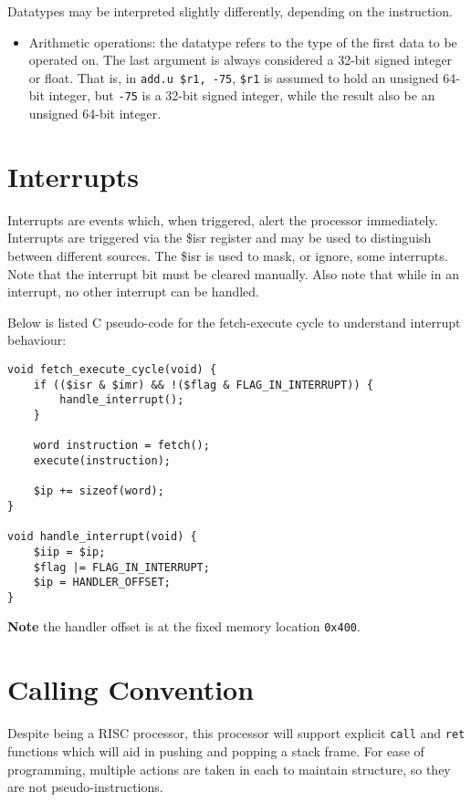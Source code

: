 \documentclass[10pt]{article}
\begin{document}
\bigskip
Datatypes may be interpreted slightly differently, depending on the instruction.

\begin{itemize}
    \item Arithmetic operations: the datatype refers to the type of the first data to be operated on.
    The last argument is always considered a 32-bit signed integer or float.
    That is, in \texttt{add.u \$r1, -75}, \texttt{\$r1} is assumed to hold an unsigned 64-bit integer, but \texttt{-75} is a 32-bit signed integer, while the result also be an unsigned 64-bit integer.

\end{itemize}

\section{Interrupts}

Interrupts are events which, when triggered, alert the processor immediately.
Interrupts are triggered via the \$isr register and may be used to distinguish between different sources.
The \$isr is used to mask, or ignore, some interrupts.
Note that the interrupt bit must be cleared manually.
Also note that while in an interrupt, no other interrupt can be handled.

Below is listed C pseudo-code for the fetch-execute cycle to understand interrupt behaviour:

\begin{lstlisting}[style=c]
void fetch_execute_cycle(void) {
    if (($isr & $imr) && !($flag & FLAG_IN_INTERRUPT)) {
        handle_interrupt();
    }

    word instruction = fetch();
    execute(instruction);

    $ip += sizeof(word);
}

void handle_interrupt(void) {
    $iip = $ip;
    $flag |= FLAG_IN_INTERRUPT;
    $ip = HANDLER_OFFSET;
}
\end{lstlisting}

\textbf{Note} the handler offset is at the fixed memory location \texttt{0x400}.

\section{Calling Convention}

Despite being a RISC processor, this processor will support explicit \texttt{call} and \texttt{ret} functions which will aid in pushing and popping a stack frame.
For ease of programming, multiple actions are taken in each to maintain structure, so they are not pseudo-instructions.
\end{document}

